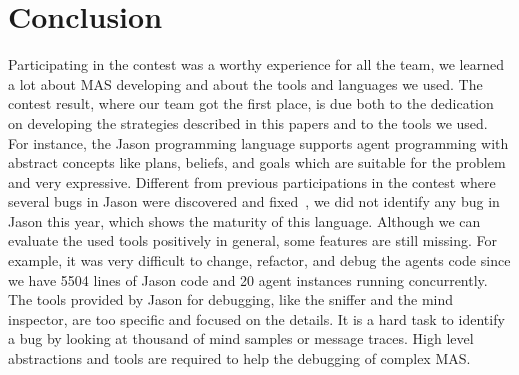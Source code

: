 
\section{Conclusion}

Participating in the contest was a worthy experience for all the team, we learned a lot about MAS developing and about the tools and languages we used. The contest result, where our team got the first place, is due both to the dedication on developing the strategies described in this papers and to the tools we used. For instance, the Jason programming language supports agent programming with abstract concepts like plans, beliefs, and goals which are suitable for the problem and very expressive. Different from previous participations in the contest where several bugs in Jason were discovered and fixed~\cite{hubner:10a}, we did not identify any bug in Jason this year, which shows the maturity of this language. Although we can evaluate the used tools positively in general, some features are still missing. For example, it was very difficult to change, refactor, and debug the agents code since we have 5504 lines of Jason code and 20 agent instances running concurrently. The tools provided by Jason for debugging, like the sniffer and the mind inspector, are too specific and focused on the details. It is a hard task to identify a bug by looking at thousand of mind samples or message traces. High level abstractions and tools are required to help the debugging of complex MAS.

